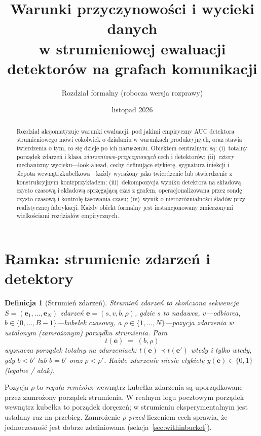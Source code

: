 \documentclass[11pt]{article}
\title{Warunki przyczynowości i wycieki danych\\
w strumieniowej ewaluacji detektorów na grafach komunikacji}
\author{Rozdział formalny (robocza wersja rozprawy)}
\date{listopad 2026}
\newtheorem{definition}[theorem]{Definicja}
\newcommand{\event}{\mathbf{e}}
\newcommand{\strict}{\prec}
\begin{document}
\maketitle

\begin{abstract}
Rozdział aksjomatyzuje warunki ewaluacji, pod jakimi empiryczny AUC
detektora strumieniowego mówi cokolwiek o działaniu w warunkach
produkcyjnych, oraz stawia twierdzenia o tym, co się dzieje po ich
naruszeniu. Obiektem centralnym są: (i)~totalny porządek zdarzeń i klasa
\emph{zdarzeniowo-przyczynowych} cech i detektorów; (ii)~cztery
mechanizmy wycieku---look-ahead, cechy definujące etykietę, sygnatura
iniekcji i ślepota wewnątrzkubełkowa---każdy wyrażony jako twierdzenie
lub stwierdzenie z konstrukcyjnym kontrprzykładem;
(iii)~dekompozycja wyniku detektora na składową czysto czasową i
składową sprzęgającą czas z grafem, operacjonalizowana przez sondę
czysto czasową i kontrolę tasowania czasu; (iv)~wynik o
nierozróżnialności śladów przy realistycznej fabrykacji. Każdy obiekt
formalny jest instancjonowany zmierzonymi wielkościami rozdziałów
empirycznych.
\end{abstract}

\tableofcontents

\section{Ramka: strumienie zdarzeń i detektory}
\label{sec:setting}

\begin{definition}[Strumień zdarzeń]
\label{def:stream}
\emph{Strumień zdarzeń} to skończona sekwencja
$S=(\event_1,\dots,\event_N)$ zdarzeń
$\event=(s,v,b,\rho)$, gdzie $s$ to nadawca, $v$---odbiorca,
$b\in\{0,\dots,B-1\}$---\emph{kubełek czasowy}, a
$\rho\in\{1,\dots,N\}$---pozycja zdarzenia w ustalonym (zamrożonym)
porządku strumienia. Para
\[
t(\event) \;=\; (b,\rho)
\]
wyznacza \emph{porządek totalny} na zdarzeniach: $t(\event)\strict
t(\event')$ wtedy i tylko wtedy, gdy $b<b'$ lub $b=b'$ oraz
$\rho<\rho'$. Każde zdarzenie niesie etykietę $y(\event)\in\{0,1\}$
(legalne / atak).
\end{definition}

Pozycja $\rho$ to \emph{reguła remisów}: wewnątrz kubełka zdarzenia są
uporządkowane przez zamrożony porządek strumienia. W realnym logu
pocztowym porządek wewnątrz kubełka to porządek doręczeń; w strumieniu
eksperymentalnym jest ustalany raz na przebieg. Zamrożenie $\rho$
\emph{przed} liczeniem cech sprawia, że jednoczesność jest dobrze
zdefiniowana (sekcja~\ref{sec:withinbucket}).
\end{document}
